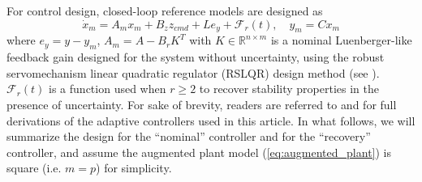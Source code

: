 \documentclass[english]{ifacconf}
\begin{document}
For control design, closed-loop reference models are designed as
\begin{equation}
\dot{x}_m = A_m x_m + B_z z_{cmd} + L e_y + \mathcal{F}_r(t), \quad y_m = C x_m
\end{equation}
where $e_y = y - y_m$, $A_m = A - B_r K^T$ with $K\in\mathbb{R}^{n\times m}$ is a nominal Luenberger-like feedback gain designed for the system without uncertainty, using the robust servomechanism linear quadratic regulator (RSLQR) design method (see \cite{lavretsky2013robust}). $\mathcal{F}_r(t)$ is a function used when $r \geq 2$ to recover stability properties in the presence of uncertainty. For sake of brevity, readers are referred to \cite{qu2016phd} and \cite{qu2016adaptive} for full derivations of the adaptive controllers used in this article. In what follows, we will summarize the design for the ``nominal'' controller and for the ``recovery'' controller, and assume the augmented plant model (\ref{eq:augmented_plant}) is square (i.e. $m = p$) for simplicity.
 
\end{document}
